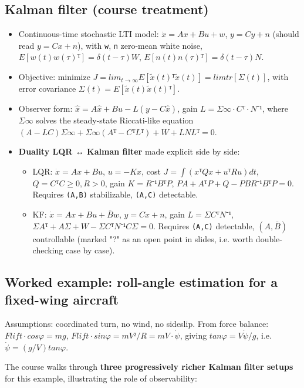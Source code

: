 \documentclass[11pt]{article}
\begin{document}
\subsection{Kalman filter (course treatment)}
\begin{itemize}
\item Continuous-time stochastic LTI model: $\dot{x} = Ax + Bu + w$, $y = Cy + n$ (should read $y = Cx + n$), with \texttt{w}, \texttt{n} zero-mean white noise, $E[w(t)w(τ)ᵀ] = δ(t-τ)W$, $E[n(t)n(τ)ᵀ] = δ(t-τ)N$.
\item Objective: minimize $J = lim_{t→∞} E[\tilde{x}(t)ᵀ\tilde{x}(t)] = lim tr[Σ(t)]$, with error covariance $Σ(t) = E[\tilde{x}(t)\tilde{x}(t)ᵀ]$.
\item Observer form: $\hat{x\dot{}} = A\hat{x} + Bu - L(y - C\hat{x})$, gain $L = Σ∞·Cᵀ·N⁻¹$, where $Σ∞$ solves the steady-state Riccati-like equation $(A-LC)Σ∞ + Σ∞(Aᵀ-CᵀLᵀ) + W + LNLᵀ = 0$.
\item \textbf{Duality LQR ↔ Kalman filter} made explicit side by side:
\begin{itemize}
\item LQR: $\dot{x}=Ax+Bu$, $u=-Kx$, cost $J=∫(xᵀQx+uᵀRu)dt$, $Q=CᵀC≥0, R>0$, gain $K=R⁻¹BᵀP$, $PA+AᵀP+Q-PBR⁻¹BᵀP=0$. Requires \texttt{(A,B)} stabilizable, \texttt{(A,C)} detectable.
\item KF: $\dot{x}=Ax+Bu+\bar{B}w$, $y=Cx+n$, gain $L=ΣCᵀN⁻¹$, $ΣAᵀ+AΣ+W-ΣCᵀN⁻¹CΣ=0$. Requires \texttt{(A,C)} detectable, $(A,\bar{B})$ controllable (marked "?" as an open point in slides, i.e. worth double-checking case by case).
\end{itemize}
\end{itemize}

\subsection{Worked example: roll-angle estimation for a fixed-wing aircraft}
Assumptions: coordinated turn, no wind, no sideslip. From force balance: $Flift·cosφ = mg$, $Flift·sinφ = mV²/R = mV·\dot{ψ}$, giving $tanφ = V\dot{ψ}/g$, i.e. $\dot{ψ} = (g/V)tanφ$.

The course walks through \textbf{three progressively richer Kalman filter setups} for this example, illustrating the role of observability:
\end{document}
